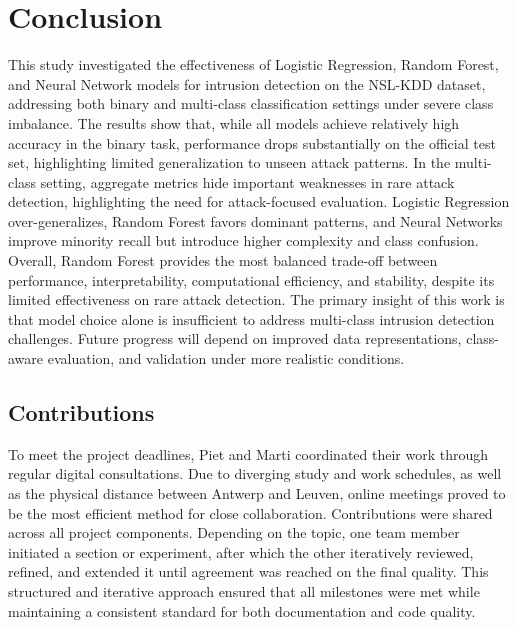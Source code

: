 \chapter{Conclusion}
\label{cha:conclusion}
This study investigated the effectiveness of Logistic Regression, Random Forest, and Neural Network models for intrusion detection on the NSL-KDD dataset, 
addressing both binary and multi-class classification settings under severe class imbalance. The results show that, while all models achieve relatively high accuracy 
in the binary task, performance drops substantially on the official test set, highlighting limited generalization to unseen attack patterns. In the multi-class setting, 
aggregate metrics hide important weaknesses in rare attack detection, highlighting the need for attack-focused evaluation. Logistic Regression over-generalizes, 
Random Forest favors dominant patterns, and Neural Networks improve minority recall but introduce higher complexity and class confusion. Overall, Random Forest provides 
the most balanced trade-off between performance, interpretability, computational efficiency, and stability, despite its limited effectiveness on rare attack detection. 
The primary insight of this work is that model choice alone is insufficient to address multi-class intrusion detection challenges. Future progress will depend on improved 
data representations, class-aware evaluation, and validation under more realistic conditions.

\section{Contributions}

To meet the project deadlines, Piet and Marti coordinated their work through regular digital consultations. 
Due to diverging study and work schedules, as well as the physical distance between Antwerp and Leuven, online meetings proved to be the most efficient method for close 
collaboration. Contributions were shared across all project components. Depending on the topic, one team member initiated a section or experiment, after which the other iteratively reviewed, refined, and extended it until agreement was reached on the final quality. This structured and iterative approach ensured that all milestones were met while maintaining a consistent standard for both documentation and code quality.